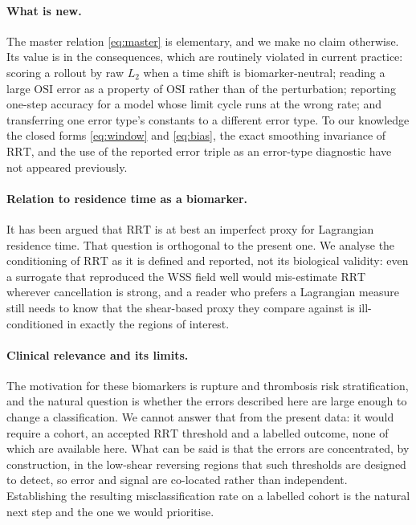 \documentclass[11pt,a4paper]{article}
\newcommand{\OSI}{\mathrm{OSI}}
\newcommand{\RRT}{\mathrm{RRT}}
\begin{document}
\paragraph{What is new.}
The master relation \eqref{eq:master} is elementary, and we make no claim
otherwise. Its value is in the consequences, which are routinely violated in
current practice: scoring a rollout by raw $L_2$ when a time shift is
biomarker-neutral; reading a large $\OSI$ error as a property of $\OSI$
rather than of the perturbation; reporting one-step accuracy for a model
whose limit cycle runs at the wrong rate; and transferring one error type's
constants to a different error type. To our knowledge the closed forms
\eqref{eq:window} and \eqref{eq:bias}, the exact smoothing invariance of
$\RRT$, and the use of the reported error triple as an error-type diagnostic
have not appeared previously.

\paragraph{Relation to residence time as a biomarker.}
It has been argued that $\RRT$ is at best an imperfect proxy for Lagrangian
residence time. That question is orthogonal to the present one. We analyse
the conditioning of $\RRT$ as it is defined and reported, not its biological
validity: even a surrogate that reproduced the WSS field well would
mis-estimate $\RRT$ wherever cancellation is strong, and a reader who prefers
a Lagrangian measure still needs to know that the shear-based proxy they
compare against is ill-conditioned in exactly the regions of interest.

\paragraph{Clinical relevance and its limits.}
The motivation for these biomarkers is rupture and thrombosis risk
stratification, and the natural question is whether the errors described here
are large enough to change a classification. We cannot answer that from the
present data: it would require a cohort, an accepted $\RRT$ threshold and a
labelled outcome, none of which are available here. What can be said is that
the errors are concentrated, by construction, in the low-shear reversing
regions that such thresholds are designed to detect, so error and signal are
co-located rather than independent. Establishing the resulting
misclassification rate on a labelled cohort is the natural next step and the
one we would prioritise.
\end{document}
